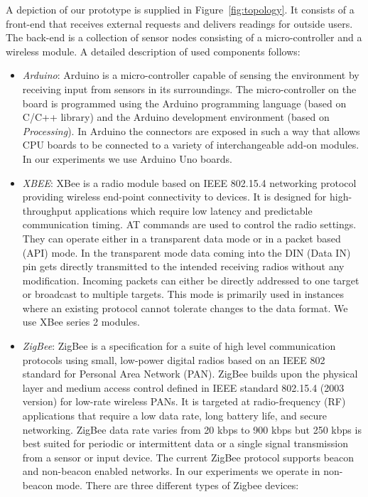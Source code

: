 A depiction of our prototype is supplied in Figure~\ref{fig:topology}. It consists of a front-end that receives external requests and delivers readings for outside users. The back-end is a collection of sensor nodes consisting of a micro-controller and a wireless module. A detailed description of used components follows:
\begin{itemize}
\item{\emph{Arduino}: Arduino is a micro-controller capable of sensing the environment by receiving input from sensors in its surroundings. The micro-controller on the board is programmed using the Arduino programming language (based on C/C++ library) and the Arduino development environment (based on \textit{Processing}). In Arduino the connectors are exposed in such a way that allows CPU boards to be connected to a variety of interchangeable add-on modules. In our experiments we use Arduino Uno boards.}
\item{\emph{XBEE}: XBee is a radio module based on IEEE 802.15.4 networking protocol providing wireless end-point connectivity to devices.  It is designed for high-throughput applications which require low latency and predictable communication timing. AT commands are used to control the radio settings. They can operate either in a transparent data mode or in a packet based (API) mode. In the transparent mode data coming into the DIN (Data IN) pin gets directly transmitted to the intended receiving radios without any modification. Incoming packets can either be directly addressed to one target or broadcast to multiple targets. This mode is primarily used in instances where an existing protocol cannot tolerate changes to the data format. We use XBee series 2 modules.}
\item{\emph{ZigBee}: ZigBee is a specification for a suite of high level communication protocols using small, low-power digital radios based on an IEEE 802 standard for Personal Area Network (PAN). ZigBee builds upon the physical layer and medium access control defined in IEEE standard 802.15.4 (2003 version) for low-rate wireless PANs.  It is targeted at radio-frequency (RF) applications that require a low data rate, long battery life, and secure networking. ZigBee data rate varies from 20 kbps to 900 kbps but 250 kbps is best suited for periodic or intermittent data or a single signal transmission from a sensor or input device. The current ZigBee protocol supports beacon and non-beacon enabled networks. In our experiments we operate in non-beacon mode. There are three different types of Zigbee devices: 
}
\end{itemize}

